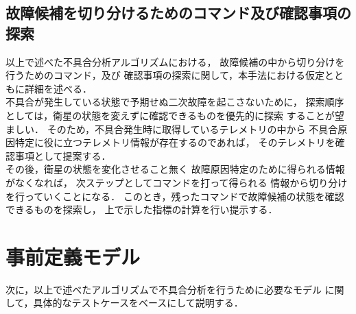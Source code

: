 \documentclass[11pt]{jsreport}
\begin{document}
\subsection{故障候補を切り分けるためのコマンド及び確認事項の探索}
以上で述べた不具合分析アルゴリズムにおける，
故障候補の中から切り分けを行うためのコマンド，及び
確認事項の探索に関して，本手法における仮定とともに詳細を述べる．\\
不具合が発生している状態で予期せぬ二次故障を起こさないために，
探索順序としては，衛星の状態を変えずに確認できるものを優先的に探索
することが望ましい．
そのため，不具合発生時に取得しているテレメトリの中から
不具合原因特定に役に立つテレメトリ情報が存在するのであれば，
そのテレメトリを確認事項として提案する．\\
その後，衛星の状態を変化させること無く
故障原因特定のために得られる情報がなくなれば，
次ステップとしてコマンドを打って得られる
情報から切り分けを行っていくことになる．
このとき，残ったコマンドで故障候補の状態を確認できるものを探索し，
上で示した指標の計算を行い提示する．




\section{事前定義モデル}
次に，以上で述べたアルゴリズムで不具合分析を行うために必要なモデル
に関して，具体的なテストケースをベースにして説明する．%

\end{document}
